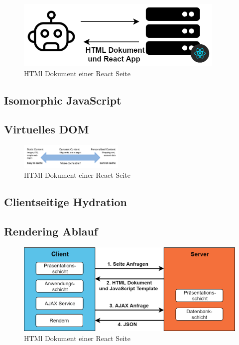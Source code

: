 \documentclass[runningheads]{llncs}
\begin{document}
\begin{figure}[h]
  \centering
  \includegraphics[width=10cm]{images/universalseo}
  \caption{HTMl Dokument einer React Seite}
\end{figure}

\subsection{Isomorphic JavaScript}
\label{subsec:Isomorphic JavaScript}

\subsection{Virtuelles DOM}
\label{subsec:Virtuelles DOM}

\begin{figure}[h]
  \centering
  \includegraphics[width=5cm]{images/caching}
  \caption{HTMl Dokument einer React Seite}
\end{figure}

\subsection{Clientseitige Hydration}
\label{subsec:Clientseitige Hydration}

\subsection{Rendering Ablauf}
\label{subsec:Rendering Ablauf}

\begin{figure}[h]
  \centering
  \includegraphics[width=12cm]{images/universal}
  \caption{HTMl Dokument einer React Seite}
\end{figure}
\end{document}

